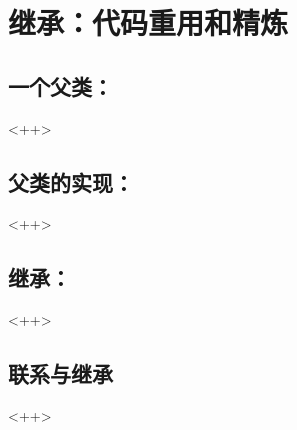 

\chapter{继承：代码重用和精炼}

\section{一个父类：}<++>

\section{父类的实现：}<++>

\section{继承：}<++>

\section{联系与继承}<++>

